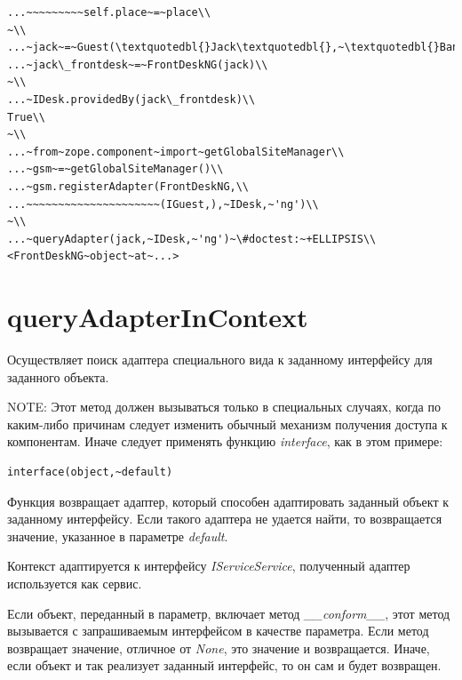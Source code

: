\documentclass[a4paper,openany,twoside,draft]{book}
\providecommand*{\DUroletitlereference}[1]{\textsl{#1}}
\begin{document}
\begin{verbatim}
...~~~~~~~~~self.place~=~place\\
~\\
...~jack~=~Guest(\textquotedbl{}Jack\textquotedbl{},~\textquotedbl{}Bangalore\textquotedbl{})\\
...~jack\_frontdesk~=~FrontDeskNG(jack)\\
~\\
...~IDesk.providedBy(jack\_frontdesk)\\
True\\
~\\
...~from~zope.component~import~getGlobalSiteManager\\
...~gsm~=~getGlobalSiteManager()\\
...~gsm.registerAdapter(FrontDeskNG,\\
...~~~~~~~~~~~~~~~~~~~~~(IGuest,),~IDesk,~'ng')\\
~\\
...~queryAdapter(jack,~IDesk,~'ng')~\#doctest:~+ELLIPSIS\\
<FrontDeskNG~object~at~...>
\end{verbatim}


\section*{queryAdapterInContext%
  \label{queryadapterincontext}%
}

Осуществляет поиск адаптера специального вида к заданному интерфейсу
для заданного объекта.

NOTE: Этот метод должен вызываться только в специальных случаях, когда
по каким-либо причинам следует изменить обычный механизм получения
доступа к компонентам.  Иначе следует применять функцию \DUroletitlereference{interface},
как в этом примере:

\begin{verbatim}
interface(object,~default)
\end{verbatim}

Функция возвращает адаптер, который способен адаптировать заданный
объект к заданному интерфейсу.  Если такого адаптера не удается найти,
то возвращается значение, указанное в параметре \DUroletitlereference{default}.

Контекст адаптируется к интерфейсу \DUroletitlereference{IServiceService}, полученный адаптер
используется как сервис.

Если объект, переданный в параметр, включает метод \DUroletitlereference{\_\_conform\_\_}, этот
метод вызывается с запрашиваемым интерфейсом в качестве параметра.
Если метод возвращает значение, отличное от \DUroletitlereference{None}, это значение
и возвращается.  Иначе, если объект и так реализует заданный
интерфейс, то он сам и будет возвращен.
\end{document}
